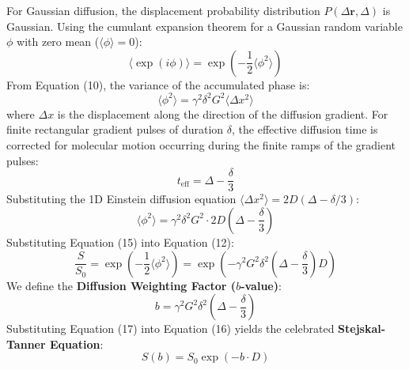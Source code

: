 \documentclass[11pt,a4paper]{article}
\begin{document}
For Gaussian diffusion, the displacement probability distribution $P(\Delta \mathbf{r}, \Delta)$ is Gaussian. Using the cumulant expansion theorem for a Gaussian random variable $\phi$ with zero mean ($\langle \phi \rangle = 0$):
\begin{equation}
    \langle \exp(i \phi) \rangle = \exp\left( -\frac{1}{2} \langle \phi^2 \rangle \right)
\end{equation}
From Equation (10), the variance of the accumulated phase is:
\begin{equation}
    \langle \phi^2 \rangle = \gamma^2 \delta^2 G^2 \langle \Delta x^2 \rangle
\end{equation}
where $\Delta x$ is the displacement along the direction of the diffusion gradient. For finite rectangular gradient pulses of duration $\delta$, the effective diffusion time is corrected for molecular motion occurring during the finite ramps of the gradient pulses:
\begin{equation}
    t_{\text{eff}} = \Delta - \frac{\delta}{3}
\end{equation}
Substituting the 1D Einstein diffusion equation $\langle \Delta x^2 \rangle = 2 D (\Delta - \delta / 3)$:
\begin{equation}
    \langle \phi^2 \rangle = \gamma^2 \delta^2 G^2 \cdot 2 D \left( \Delta - \frac{\delta}{3} \right)
\end{equation}
Substituting Equation (15) into Equation (12):
\begin{equation}
    \frac{S}{S_0} = \exp\left( -\frac{1}{2} \langle \phi^2 \rangle \right) = \exp\left( -\gamma^2 G^2 \delta^2 \left( \Delta - \frac{\delta}{3} \right) D \right)
\end{equation}
We define the \textbf{Diffusion Weighting Factor ($b$-value)}:
\begin{equation}
    b = \gamma^2 G^2 \delta^2 \left( \Delta - \frac{\delta}{3} \right)
\end{equation}
Substituting Equation (17) into Equation (16) yields the celebrated \textbf{Stejskal-Tanner Equation}:
\begin{equation}
    S(b) = S_0 \exp\left( -b \cdot D \right)
\end{equation}
\end{document}

